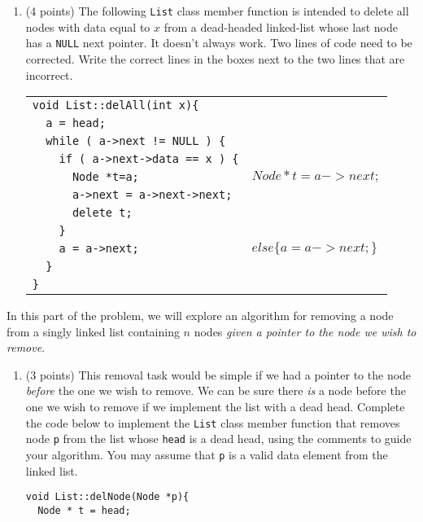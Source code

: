 \documentclass[11pt,table]{article}
\renewcommand{\arraystretch}{2}
\begin{document}
\begin{enumerate}
\begin{enumerate}
\item (4 points) The following \texttt{List} class member function is intended to delete all nodes with data equal to $x$ from a dead-headed linked-list whose last node has a \texttt{NULL} next pointer.
It doesn't always work.
Two lines of code need to be corrected.
Write the correct lines in the boxes next to the two lines that are incorrect.

\bgroup
\renewcommand{\arraystretch}{1.5}
\begin{tabular}{l|p{7.3cm}|}
\cline{2-2}
\verb|void List::delAll(int x){|&\\
\cline{2-2}
\verb|  a = head;|& \(\)\\
\cline{2-2}
\verb|  while ( a->next != NULL ) {|&\\
\cline{2-2}
\verb|    if ( a->next->data == x ) {|&\\
\cline{2-2}
\verb|      Node *t=a;|& \(Node *t = a->next;\)\\
\cline{2-2}
\verb|      a->next = a->next->next;|&\\
\cline{2-2}
\verb|      delete t;|&\\
\cline{2-2}
\verb|    }|&\\
\cline{2-2}
\verb|    a = a->next;|&\(else \{a = a->next;\} \)\\
\cline{2-2}
\verb|  }|&\\
\cline{2-2}
\verb|}|&\\
\cline{2-2}
\end{tabular}
\egroup

\end{enumerate}

In this part of the problem, we will explore an algorithm for removing a node from a singly linked list containing $n$ nodes \emph{given a pointer to the node we wish to remove}. 
\begin{enumerate}[resume]

\item (3 points) This removal task would be simple if we had a 
pointer to the node \emph{before} the one we wish to 
remove. We can be sure there \emph{is} a node before the one we wish to remove if we implement the list with a dead head. Complete the code below to implement the \texttt{List} class member function that removes node \texttt{p} from the list whose \texttt{head} is a dead head, using the comments to guide your algorithm.
You may assume that \texttt{p} is a valid data element from the linked list.

\begin{Verbatim}[frame=single,framerule=2pt]
void List::delNode(Node *p){
  Node * t = head;
  

\end{Verbatim}
\end{enumerate}
\end{enumerate}
\end{document}
